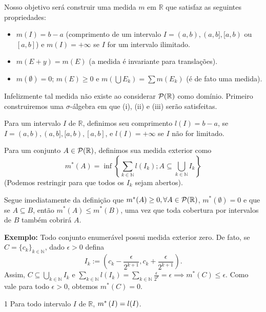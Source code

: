 
\noindent
Nosso objetivo será construir uma medida $m$ em $\mathbb{R}$ que satisfaz as seguintes propriedades:
\begin{itemize}
    \item[i)] $m(I) = b-a$ (comprimento de um intervalo $I = (a,b), (a,b], [a,b)$ ou $[a,b]$) e $m(I) = +\infty$ se $I$ for um intervalo ilimitado.
    \item[ii)] $m(E+y) = m(E)$ (a medida é invariante para translações).
    \item[iii)] $m(\emptyset) = 0$; $m(E) \ge 0$ e $m\left(\bigcup E_k\right) = \sum m(E_k)$ (é de fato uma medida).
\end{itemize}

Infelizmente tal medida não existe ao considerar $\mathcal{P}(\mathbb{R})$ como domínio. Primeiro construiremos uma $\sigma$-álgebra em que (i), (ii) e (iii) serão satisfeitas.


Para um intervalo $I$ de $\mathbb{R}$, definimos seu comprimento $l(I) = b-a$, se $I = (a,b), (a,b], [a,b), [a,b]$, e $l(I) = +\infty$ se $I$ não for limitado.

\begin{definition*}{}
Para um conjunto $A \in \mathcal{P}(\mathbb{R})$, definimos sua medida exterior como
$$ m^*(A) = \inf \left\{ \sum_{k \in \mathbb{N}} l(I_k) ; A \subseteq \bigcup_{k \in \mathbb{N}} I_k \right\} $$
(Podemos restringir para que todos os $I_k$ sejam abertos).
\end{definition*}

Segue imediatamente da definição que $m^*(A) \ge 0, \forall A \in \mathcal{P}(\mathbb{R})$, $m^*(\emptyset) = 0$ e que se $A \subseteq B$, então $m^*(A) \le m^*(B)$, uma vez que toda cobertura por intervalos de $B$ também cobrirá $A$.

\textbf{Exemplo:} Todo conjunto enumerável possui medida exterior zero. De fato, se $C = \{c_k\}_{k \in \mathbb{N}}$, dado $\epsilon > 0$ defina
$$ I_k := \left(c_k - \frac{\epsilon}{2^{k+1}}, c_k + \frac{\epsilon}{2^{k+1}}\right). $$
Assim, $C \subseteq \bigcup_{k \in \mathbb{N}} I_k$ e $\sum_{k \in \mathbb{N}} l(I_k) = \sum_{k \in \mathbb{N}} \frac{\epsilon}{2^k} = \epsilon \implies m^*(C) \le \epsilon$. Como vale para todo $\epsilon > 0$, obtemos $m^*(C) = 0$.

\begin{prop*}{1}
  Para todo intervalo $I$ de $\mathbb{R}$, $m^*\left(I\right) = l(I)$.
\end{prop*}

